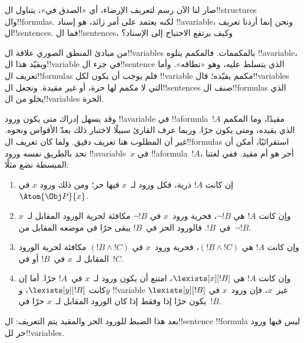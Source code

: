 \documentclass[../../../include/open-logic-section]{subfiles}
\begin{document}


صار لنا الآن رسم لتعريف الإرضاء، أي «الصدق في»، يتناول
ال!!{structure}s وال!!{formula}s. لكنه يعتمد على أمر زائد، هو
إسناد !!a{variable}، ونحن إنما أردنا تعريف ال!!{sentence}s.
فما ال!!{sentence}s، وكيف يرتفع الاحتياج إلى الإسناد؟

من مبادئ المنطق الصوري علاقة ال!!{variable}s بالمكممات. فالمكمم
يتلوه !!a{variable}، ويقيّد هذا ال!!{variable} في جزء
ال!!{sentence} الذي يتسلط عليه، وهو «نطاقه». وأما تعريف
ال!!{formula}s فلم يوجب أن يكون لكل !!{variable} مكمم يقيّده؛
فال!!{variable}s التي لا مكمم لها حرة، أو غير مقيدة. ونجعل
ال!!{sentence}s صنف ال!!{formula}s الذي يخلو من
ال!!{variable}s الحرة.

وقد يسهل إدراك متى يكون ورود !!a{variable} في
!!a{formula}~$!A$ مقيدًا، وما المكمم الذي يقيده، ومتى يكون حرًا.
وربما عرف القارئ سبيلًا لاختبار ذلك بعدّ الأقواس ونحوه. غير أن
المطلوب هنا تعريف دقيق. ولما كان تعريف ال!!{formula}s استقرائيًا،
أمكن أن نحد بالطريق نفسه ورود !!a{variable}~$x$ في
!!a{formula}~$!A$، أحر هو أم مقيد. ففي لغتنا المبسطة نضع مثلًا:
\begin{enumerate}
  \item إن كانت $!A$ ذرية، فكل ورود لـ~$x$ فيها حر؛ ومن ذلك ورود
  $x$ في~$\Atom{\Obj P}{x}$.
  \item وإن كانت $!A$ هي $\lnot !B$، فحرية ورود~$x$ في
  $\lnot !B$ مكافئة لحرية الورود المقابل لـ~$x$ في~$!B$.
  فالورود الحر في~$!B$ يبقى حرًا في موضعه المقابل من~$\lnot !B$.
  \item وإن كانت $!A$ هي $(!B \land !C)$، فحرية ورود~$x$ في
  $(!B \land !C)$ مكافئة لحرية الورود المقابل لـ~$x$
  في~$!B$ أو في~$!C$.
  \item وإن كانت $!A$ هي $\lexists[x][!B]$، امتنع أن يكون ورود
  لـ~$x$ في~$!A$ حرًا. أما إن كانت $\lexists[y][!B]$، و$y$
  !!{variable} غير~$x$، فإن ورود~$x$ في $\lexists[y][!B]$
  يكون حرًا إذا وفقط إذا كان الورود المقابل لـ~$x$ حرًا في~$!B$.
\end{enumerate}

بعد هذا الضبط للورود الحر والمقيد يتم التعريف: ال!!{sentence}
!!{formula} ليس فيها ورود حر لل!!{variable}s.
\end{document}
